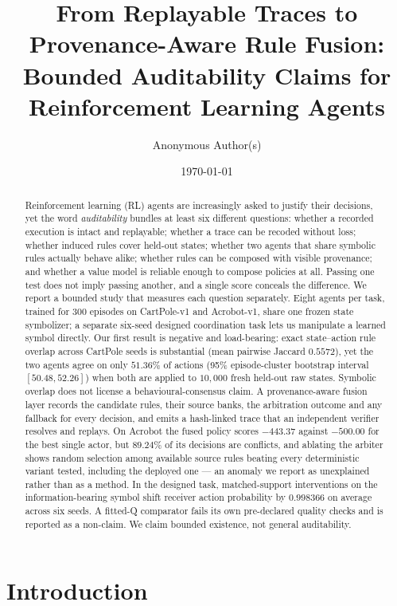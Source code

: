 \documentclass[11pt,a4paper]{article}
\title{\vspace{-1.2em}From Replayable Traces to Provenance-Aware Rule Fusion:\\ Bounded Auditability Claims for Reinforcement Learning Agents\vspace{-0.4em}}
\author{Anonymous Author(s)}
\date{\today}
\begin{document}
\maketitle

\begin{abstract}
\noindent
Reinforcement learning (RL) agents are increasingly asked to justify their decisions, yet the word \emph{auditability} bundles at least six different questions: whether a recorded execution is intact and replayable; whether a trace can be recoded without loss; whether induced rules cover held-out states; whether two agents that share symbolic rules actually behave alike; whether rules can be composed with visible provenance; and whether a value model is reliable enough to compose policies at all. Passing one test does not imply passing another, and a single score conceals the difference. We report a bounded study that measures each question separately. Eight agents per task, trained for 300 episodes on CartPole-v1 and Acrobot-v1, share one frozen state symbolizer; a separate six-seed designed coordination task lets us manipulate a learned symbol directly. Our first result is negative and load-bearing: exact state--action rule overlap across CartPole seeds is substantial (mean pairwise Jaccard $0.5572$), yet the two agents agree on only $51.36\%$ of actions (95\% episode-cluster bootstrap interval $[50.48,52.26]$) when both are applied to $10{,}000$ fresh held-out raw states. Symbolic overlap does not license a behavioural-consensus claim. A provenance-aware fusion layer records the candidate rules, their source banks, the arbitration outcome and any fallback for every decision, and emits a hash-linked trace that an independent verifier resolves and replays. On Acrobot the fused policy scores $-443.37$ against $-500.00$ for the best single actor, but $89.24\%$ of its decisions are conflicts, and ablating the arbiter shows random selection among available source rules beating every deterministic variant tested, including the deployed one --- an anomaly we report as unexplained rather than as a method. In the designed task, matched-support interventions on the information-bearing symbol shift receiver action probability by $0.998366$ on average across six seeds. A fitted-Q comparator fails its own pre-declared quality checks and is reported as a non-claim. We claim bounded existence, not general auditability.
\end{abstract}

\section{Introduction}
\label{sec:intro}
\end{document}
